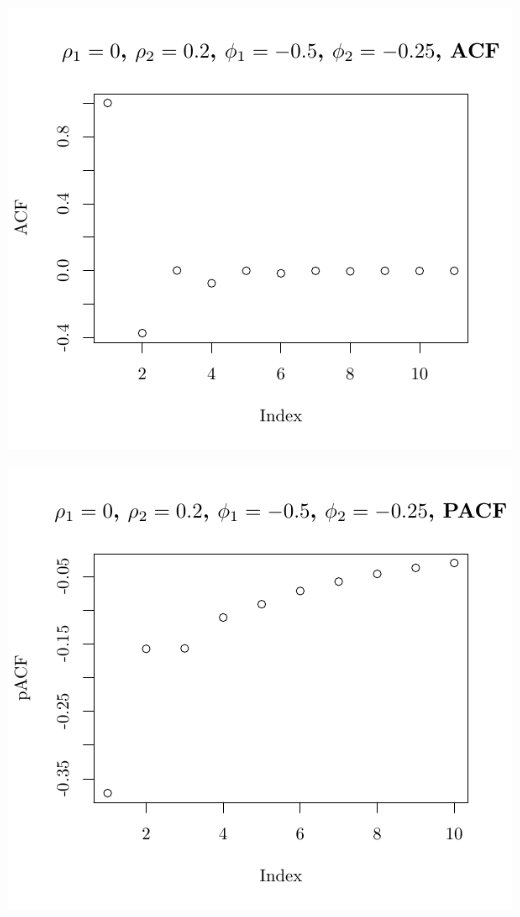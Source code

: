 \documentclass[10pt]{paper}\usepackage[]{graphicx}\usepackage[]{color}
\makeatletter
\def\maxwidth{ %
  \ifdim\Gin@nat@width>\linewidth
    \linewidth
  \else
    \Gin@nat@width
  \fi
}
\newenvironment{knitrout}{}{} %
\makeatother
\begin{document}
\begin{knitrout}
{\centering \includegraphics[width=\maxwidth]{figure/graphics-plotter-89} 

}




{\centering \includegraphics[width=\maxwidth]{figure/graphics-plotter-90} 

}





\end{knitrout}
\end{document}
